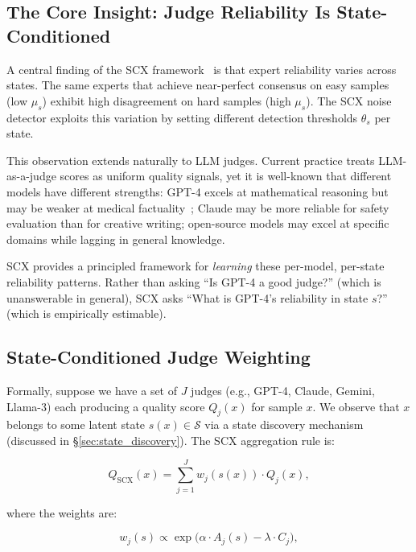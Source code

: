 \documentclass[11pt,twocolumn]{article}
\begin{document}
\subsection{The Core Insight: Judge Reliability Is State-Conditioned}

A central finding of the SCX framework~\cite{scx2026} is that expert reliability varies across states. The same experts that achieve near-perfect consensus on easy samples (low $\mu_s$) exhibit high disagreement on hard samples (high $\mu_s$). The SCX noise detector exploits this variation by setting different detection thresholds $\theta_s$ per state.

This observation extends naturally to LLM judges. Current practice treats LLM-as-a-judge scores as uniform quality signals, yet it is well-known that different models have different strengths: GPT-4 excels at mathematical reasoning but may be weaker at medical factuality~\cite{singhal2023large}; Claude may be more reliable for safety evaluation than for creative writing; open-source models may excel at specific domains while lagging in general knowledge.

SCX provides a principled framework for \textit{learning} these per-model, per-state reliability patterns. Rather than asking ``Is GPT-4 a good judge?'' (which is unanswerable in general), SCX asks ``What is GPT-4's reliability in state $s$?'' (which is empirically estimable).

\subsection{State-Conditioned Judge Weighting}

Formally, suppose we have a set of $J$ judges (e.g., GPT-4, Claude, Gemini, Llama-3) each producing a quality score $Q_j(x)$ for sample $x$. We observe that $x$ belongs to some latent state $s(x) \in \mathcal{S}$ via a state discovery mechanism (discussed in \S\ref{sec:state_discovery}). The SCX aggregation rule is:

\begin{equation}
Q_{\text{SCX}}(x) = \sum_{j=1}^J w_j(s(x)) \cdot Q_j(x),
\label{eq:scx_aggregation}
\end{equation}

where the weights are:

\begin{equation}
w_j(s) \propto \exp\bigl(\alpha \cdot A_j(s) - \lambda \cdot C_j\bigr),
\label{eq:scx_weights}
\end{equation}
\end{document}
